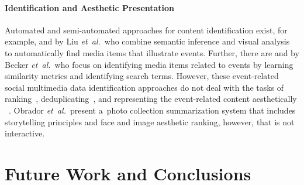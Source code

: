 \documentclass{sig-alternate}
\begin{document}
\paragraph{Identification and Aesthetic Presentation}

Automated and semi-automated approaches for content identification exist,
for example, \cite{liu2011events} and \cite{liu2011socialmedia}
by Liu \emph{et~al.}\ who combine semantic inference
and visual analysis to automatically find media items
that illustrate events.
Further, there are \cite{becker2010eventidentification}
and \cite{becker2012plannedevents} by Becker \emph{et~al.}\
who focus on identifying media items related to events
by learning similarity metrics and identifying search terms.
However, these event-related social multimedia data
identification approaches do not deal with the tasks of
ranking~\cite{liu2009learningtorank}, deduplicating~\cite{yang2009nearduplicate},
and representing the event-related content aesthetically%
~\cite{sandhaus2011photobook,obrador2012photoaesthetics}.
Obrador \emph{et~al.}\ present a~photo collection summarization system
that includes storytelling principles and face and image aesthetic ranking,
however, that is not interactive.

\section{Future Work and Conclusions}
\label{sec:future-work-and-conclusions}
\selectfont



\balancecolumns
\end{document}

